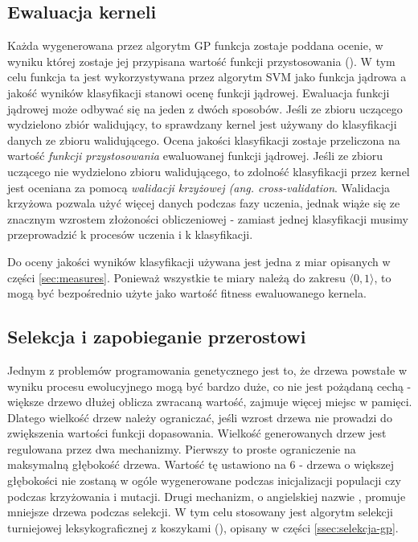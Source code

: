 \subsection{Ewaluacja kerneli}\label{sec:ewaluacja}
Każda wygenerowana przez algorytm GP funkcja zostaje poddana ocenie, w wyniku której zostaje jej przypisana wartość funkcji przystosowania (). W tym celu funkcja ta jest wykorzystywana przez algorytm SVM jako funkcja jądrowa a jakość wyników klasyfikacji stanowi ocenę funkcji jądrowej.
Ewaluacja funkcji jądrowej może odbywać się na jeden z dwóch sposobów. Jeśli ze zbioru uczącego wydzielono  zbiór walidujący, to sprawdzany kernel jest używany do klasyfikacji danych ze zbioru walidującego. Ocena jakości klasyfikacji zostaje przeliczona na wartość \textit{ funkcji przystosowania} ewaluowanej funkcji jądrowej.
Jeśli ze zbioru uczącego nie wydzielono zbioru walidującego, to zdolność klasyfikacji przez kernel jest oceniana za pomocą \textit{walidacji krzyżowej (ang. cross-validation}.
Walidacja krzyżowa pozwala użyć więcej danych podczas fazy uczenia, jednak wiąże się ze znacznym wzrostem złożoności obliczeniowej - zamiast jednej klasyfikacji musimy przeprowadzić k procesów uczenia i k klasyfikacji.

Do oceny jakości wyników klasyfikacji używana jest jedna z miar opisanych w części \ref{sec:measures}. Ponieważ wszystkie te miary należą do zakresu $ \langle 0,1 \rangle $, to mogą być bezpośrednio użyte jako wartość fitness ewaluowanego kernela.

\subsection{Selekcja i zapobieganie przerostowi}
Jednym z problemów programowania genetycznego jest to, że drzewa powstałe w wyniku procesu ewolucyjnego mogą być bardzo duże, co nie jest pożądaną cechą - większe drzewo dłużej oblicza zwracaną wartość, zajmuje więcej miejsc w pamięci. Dlatego wielkość drzew należy ograniczać, jeśli wzrost drzewa nie prowadzi do zwiększenia wartości funkcji dopasowania.
Wielkość generowanych drzew jest regulowana przez dwa mechanizmy. Pierwszy to proste ograniczenie na maksymalną głębokość drzewa. Wartość tę ustawiono na 6 - drzewa o większej głębokości nie zostaną w ogóle wygenerowane podczas inicjalizacji populacji czy podczas krzyżowania i mutacji. Drugi mechanizm, o angielskiej nazwie ,  promuje mniejsze drzewa podczas selekcji. W tym celu stosowany jest algorytm selekcji turniejowej leksykograficznej z koszykami (), opisany w części \ref{ssec:selekcja-gp}.

